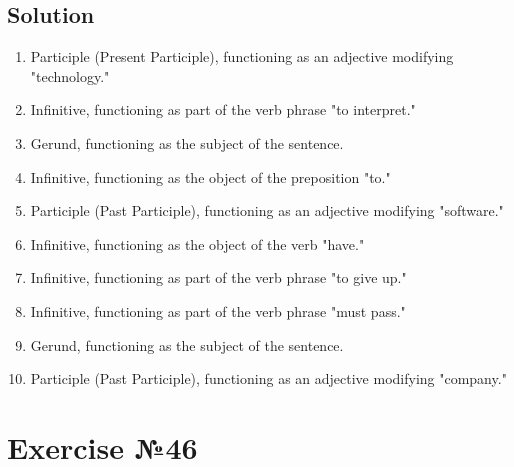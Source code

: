 \subsection*{Solution}
\begin{enumerate}
      \item Participle (Present Participle), functioning as an adjective modifying "technology."
      \item Infinitive, functioning as part of the verb phrase "to interpret."
      \item Gerund, functioning as the subject of the sentence.
      \item Infinitive, functioning as the object of the preposition "to."
      \item Participle (Past Participle), functioning as an adjective modifying "software."
      \item Infinitive, functioning as the object of the verb "have."
      \item Infinitive, functioning as part of the verb phrase "to give up."
      \item Infinitive, functioning as part of the verb phrase "must pass."
      \item Gerund, functioning as the subject of the sentence.
      \item Participle (Past Participle), functioning as an adjective modifying "company."
\end{enumerate}

\section{Exercise №46}
